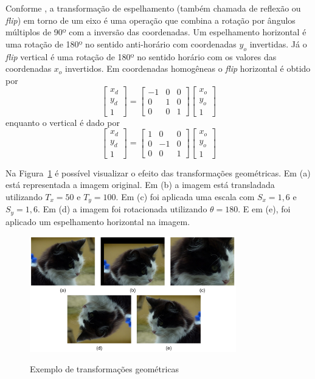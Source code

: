 \documentclass[12pt,oneside,a4paper,english,french,spanish,brazil,]{abntex2}
\begin{document}
Conforme \citet{conci:2003}, a transformação de espelhamento (também chamada de reflexão ou \textit{flip}) em torno de um eixo é uma operação que combina a rotação por ângulos múltiplos de 90º com a inversão das coordenadas. Um espelhamento horizontal é uma rotação de 180º no sentido anti-horário com coordenadas \(y_o\) invertidas. Já o \textit{flip} vertical é uma rotação de 180º no sentido horário com os valores das coordenadas \(x_o\) invertidos. Em coordenadas homogêneas o \textit{flip} horizontal é obtido por
\[
\begin{bmatrix}
x_d\\ 
y_d\\ 
1
\end{bmatrix}
=
\begin{bmatrix}
-1 & 0 & 0\\ 
0 & 1 & 0\\ 
0 & 0 & 1
\end{bmatrix}
\begin{bmatrix}
x_o\\ 
y_o\\ 
1
\end{bmatrix}
\]
enquanto o vertical é dado por
\[
\begin{bmatrix}
x_d\\ 
y_d\\ 
1
\end{bmatrix}
=
\begin{bmatrix}
1 & 0 & 0\\ 
0 & -1 & 0\\ 
0 & 0 & 1
\end{bmatrix}
\begin{bmatrix}
x_o\\ 
y_o\\ 
1
\end{bmatrix}
\]

Na Figura~\ref{fig:PDI_Transformacoes_Geometricas} é possível visualizar o efeito das transformações geométricas. Em (a) está representada a imagem original. Em (b) a imagem está transladada utilizando \(T_x=50\) e \(T_y=100\). Em (c) foi aplicada uma escala com \(S_x=1,6\) e \(S_y=1,6\). Em (d) a imagem foi rotacionada utilizando \(\theta=180\). E em (e), foi aplicado um espelhamento horizontal na imagem.

\begin{figure}[ht]
\centering
\caption{Exemplo de transformações geométricas}
\includegraphics[width=0.8\textwidth]{imagens/PDI_Transformacoes_Geometricas.pdf}
\sourceAuthor
\label{fig:PDI_Transformacoes_Geometricas}
\end{figure}
\end{document}
